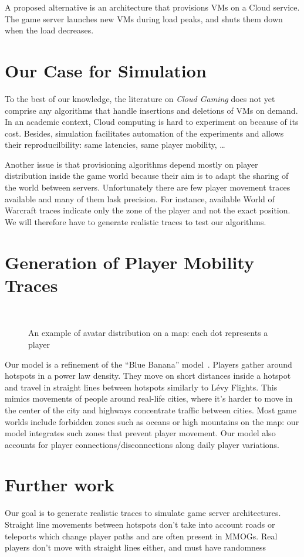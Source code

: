 \documentclass[conference]{IEEEtran}
\begin{document}
A proposed alternative is an architecture that provisions VMs on a Cloud service. The game server launches new VMs during load peaks, and shuts them down when the load decreases.

\section{Our Case for Simulation}

To the best of our knowledge, the literature on \textit{Cloud Gaming} does not yet comprise any algorithms that handle insertions and deletions of VMs on demand. In an academic context, Cloud computing is hard to experiment on because of its cost. Besides, simulation facilitates automation of the experiments and allows their reproducilbility: same latencies, same player mobility, \ldots

Another issue is that provisioning algorithms depend mostly on player distribution inside the game world because their aim is to adapt the sharing of the world between servers. 
Unfortunately there are few player movement traces available and many of them lask precision. For instance, available World of Warcraft traces indicate only the zone of the player and not the exact position. We will therefore  have to generate realistic traces to test our algorithms.

\section{Generation of Player Mobility Traces}

\begin{figure}
  \centering
  \\[0.2cm]
  \caption{An example of avatar distribution on a map: each dot represents a player}
  \label{fig:nuage}
\end{figure}

Our model is a refinement of the ``Blue Banana'' model~\cite{blue_banana}. Players gather around hotspots in a power law density. They move on short distances inside a hotspot and travel in straight lines between hotspots similarly to Lévy Flights. This mimics movements of people around real-life cities, where it's harder to move in the center of the city and highways concentrate traffic between cities. Most game worlds include forbidden zones such as oceans or high mountains on the map: our model integrates such zones that prevent player movement. Our model also accounts for player connections/disconnections along daily player variations.

\section{Further work}

Our goal is to generate realistic traces to simulate game server architectures. Straight line movements between hotspots don't take into account roads or teleports which change player paths and are often present in MMOGs. Real players don't move with straight lines either, and must have randomness



\end{document}
